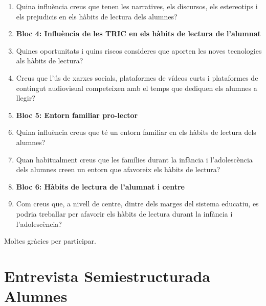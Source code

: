 \documentclass[12pt]{article}
\begin{document}
\begin{enumerate}
    \item Quina influència creus que tenen les narratives, els discursos, els estereotips i els prejudicis en els hàbits de lectura dels alumnes?
    \item [] \hspace{-\leftmargin}\textbf{Bloc 4: Influència de les TRIC en els hàbits de lectura de l’alumnat}
    \item Quines oportunitats i quins riscos consideres que aporten les noves tecnologies als hàbits de lectura?
    \item Creus que l’ús de xarxes socials, plataformes de vídeos curts i plataformes de contingut audiovisual competeixen amb el temps que dediquen els alumnes a llegir?
    \item [] \hspace{-\leftmargin}\textbf{Bloc 5: Entorn familiar pro-lector}
    \item Quina influència creus que té un entorn familiar en els hàbits de lectura dels alumnes?
    \item Quan habitualment creus que les famílies durant la infància i l’adolescència dels alumnes creen un entorn que afavoreix els hàbits de lectura?
    \item [] \hspace{-\leftmargin}\textbf{Bloc 6: Hàbits de lectura de l’alumnat i centre}
    \item Com creus que, a nivell de centre, dintre dels marges del sistema educatiu, es podria treballar per afavorir els hàbits de lectura durant la infància i l’adolescència?
\end{enumerate}

Moltes gràcies per participar.

\section{Entrevista Semiestructurada Alumnes}
\end{document}
